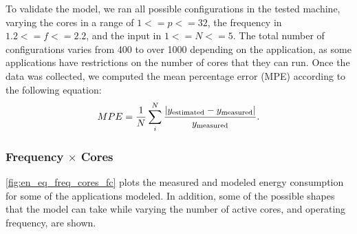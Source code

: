 To validate the model, we ran all possible configurations in the tested machine, varying the cores in a range of $1<=p<=32$, the frequency in $1.2<=f<=2.2$, and the input in $1<=N<=5$. The total number of configurations varies from 400 to over 1000 depending on the application, as some applications have restrictions on the number of cores that they can run. Once the data was collected, we computed the mean percentage error (MPE) according to the following equation:
\begin{equation}
	MPE = \frac{1}{N} \sum_i^N \frac{|y_{\rm estimated}-y_{\rm measured}|}{y_{\rm measured}}.
	\label{eq:mpe}
\end{equation}

\subsubsection{Frequency $\times$ Cores}
\cref{fig:en_eq_freq_cores_fc} plots the measured and modeled energy consumption for some of the applications modeled. In addition,  some of the possible shapes that the model can take while varying the number of active cores, and operating frequency, are shown.%

